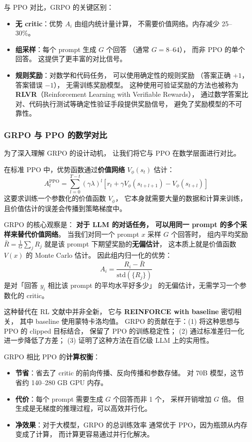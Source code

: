 与 PPO 对比，GRPO 的关键区别：
\begin{itemize}[noitemsep]
  \item \textbf{无 critic}：优势 $A_i$ 由组内统计量计算，
        不需要价值网络。内存减少 25--30\%。
  \item \textbf{组采样}：每个 prompt 生成 $G$ 个回答
       （通常 $G = 8$--$64$），
        而非 PPO 的单个回答。
        这提供了更丰富的对比信号。
  \item \textbf{规则奖励}：对数学和代码任务，
        可以使用确定性的规则奖励
       （答案正确 $+1$，答案错误 $-1$），
        无需训练奖励模型。
        这种使用可验证奖励的方法也被称为
        \textbf{RLVR}（Reinforcement Learning with Verifiable Rewards），
        通过数学答案比对、代码执行测试等确定性验证手段提供奖励信号，
        避免了奖励模型的不可靠性。
\end{itemize}

\subsubsection{GRPO 与 PPO 的数学对比}

为了深入理解 GRPO 的设计动机，
让我们将它与 PPO 在数学层面进行对比。

在标准 PPO 中，优势函数通过\textbf{价值网络} $V_\phi(s_t)$ 估计：
\begin{equation}
  A_t^{\text{PPO}} = \sum_{l=0}^{T-t} (\gamma \lambda)^l
  \left[ r_t + \gamma V_\phi(s_{t+l+1}) - V_\phi(s_{t+l}) \right]
\end{equation}
这要求训练一个参数化的价值函数 $V_\phi$，
它本身就需要大量的数据和计算来训练，
且价值估计的误差会传播到策略梯度中。

GRPO 的核心观察是：
\textbf{对于 LLM 的对话任务，
可以用同一 prompt 的多个采样来替代价值网络}。
当我们对同一个 prompt $x$ 采样 $G$ 个回答时，
组内平均奖励 $\bar{R} = \frac{1}{G}\sum_j R_j$
就是该 prompt 下期望奖励的\textbf{无偏估计}，
这本质上就是价值函数 $V(x)$ 的 Monte Carlo 估计。
因此组内归一化的优势：
\[
  A_i = \frac{R_i - \bar{R}}{\text{std}(\{R_j\})}
\]
是对「回答 $y_i$ 相比该 prompt 的平均水平好多少」
的无偏估计，无需学习一个参数化的 critic。

这种替代在 RL 文献中并非全新，
它与 \textbf{REINFORCE with baseline} 密切相关，
其中 baseline 使用蒙特卡洛均值。
GRPO 的贡献在于：(1) 将这种思想与 PPO 的 clipped 目标结合，
保留了 PPO 的训练稳定性；
(2) 通过标准差归一化进一步降低了方差；
(3) 证明了这种方法在百亿级 LLM 上的实用性。

GRPO 相比 PPO 的\textbf{计算权衡}：
\begin{itemize}[noitemsep]
  \item \textbf{节省}：省去了 critic 的前向传播、反向传播和参数存储。
        对 70B 模型，这节省约 140--280 GB GPU 内存。
  \item \textbf{代价}：每个 prompt 需要生成 $G$ 个回答而非 1 个，
        采样开销增加 $G$ 倍。
        但生成是无梯度的推理过程，可以高效并行化。
  \item \textbf{净效果}：对于大模型，GRPO 的总训练效率
        通常优于 PPO，因为瓶颈从内存变成了计算，
        而计算更容易通过并行化解决。
\end{itemize}

